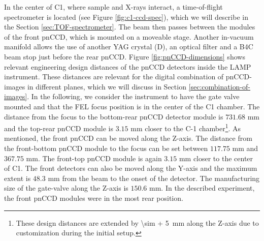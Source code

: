 In the center of C1, where sample and X-rays interact, a time-of-flight spectrometer is located (see Figure \ref{fig:c1-ccd-spec}), which we will describe in the Section \ref{sec:TOF-spectrometer}. The beam then passes between the modules of the front pnCCD, which is mounted on a moveable stage. Another in-vacuum manifold allows the use of another YAG crystal (D), an optical filter and a B4C beam stop just before the rear pnCCD. Figure \ref{fig:pnCCD-dimensions} shows relevant engineering design distances of the pnCCD detectors inside the LAMP instrument. These distances are relevant for the digital combination of pnCCD-images in different planes, which we will discuss in Section \ref{sec:combination-of-images}. In the following, we consider the instrument to have the gate valve mounted and that the FEL focus position is in the center of the C1 chamber. The distance from the focus to the bottom-rear pnCCD detector module is $731.68$ mm and the top-rear pnCCD module is $3.15$ mm closer to the C-1 chamber\footnote{These design distances are extended by \SI{\sim + 5}{\milli\meter} along the Z-axis due to customization during the initial setup.}. As mentioned, the front pnCCD can be moved along the Z-axis. The distance from the front-bottom pnCCD module to the focus can be set between $117.75$ mm and $367.75$ mm. The front-top pnCCD module is again $3.15$ mm closer to the center of C1. The front detectors can also be moved along the Y-axis and the maximum extent is $48.3$ mm from the beam to the onset of the detector. The manufacturing size of the gate-valve along the Z-axis is $150.6$ mm. In the described experiment, the front pnCCD modules were in the most rear position.\\
%
%
%
